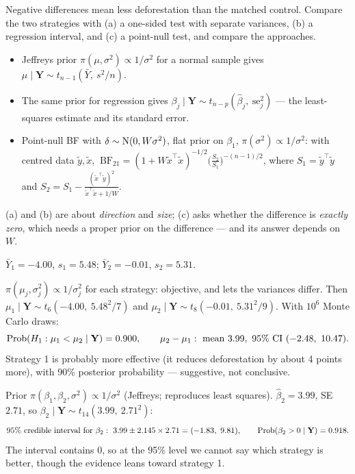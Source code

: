 \documentclass[11pt]{article}
\begin{document}
\begin{restate}
Negative differences mean less deforestation than the matched control. Compare the two strategies with (a) a one-sided test with separate variances, (b) a regression interval, and (c) a point-null test, and compare the approaches.
\end{restate}

\begin{recall}
\begin{itemize}
\item Jeffreys prior $\pi(\mu,\sigma^2)\propto1/\sigma^2$ for a normal sample gives $\mu\mid\mathbf Y\sim t_{n-1}(\bar Y,\ s^2/n)$.
\item The same prior for regression gives $\beta_j\mid\mathbf Y\sim t_{n-p}(\hat\beta_j,\ \text{se}_j^2)$ --- the least-squares estimate and its standard error.
\item Point-null BF with $\delta\sim\mathrm{N}(0,W\sigma^2)$, flat prior on $\beta_1$, $\pi(\sigma^2)\propto1/\sigma^2$: with centred data $\tilde y,\tilde x$,
$\ \text{BF}_{21}=(1+W\tilde x^\top\tilde x)^{-1/2}\Big(\frac{S_2}{S_1}\Big)^{-(n-1)/2}$, where $S_1=\tilde y^\top\tilde y$ and $S_2=S_1-\frac{(\tilde x^\top\tilde y)^2}{\tilde x^\top\tilde x+1/W}$.
\end{itemize}
\end{recall}

\begin{keyidea}
(a) and (b) are about \emph{direction} and \emph{size}; (c) asks whether the difference is \emph{exactly zero}, which needs a proper prior on the difference --- and its answer depends on $W$.
\end{keyidea}

\solution
{} $\bar Y_1=-4.00$, $s_1=5.48$; $\bar Y_2=-0.01$, $s_2=5.31$.

 $\pi(\mu_j,\sigma_j^2)\propto1/\sigma_j^2$ for each strategy: objective, and lets the variances differ. Then $\mu_1\mid\mathbf Y\sim t_6(-4.00,\ 5.48^2/7)$ and $\mu_2\mid\mathbf Y\sim t_8(-0.01,\ 5.31^2/9)$. With $10^6$ Monte Carlo draws:
\[
\mathrm{Prob}(H_1:\mu_1<\mu_2\mid\mathbf Y)=0.900,\qquad\mu_2-\mu_1:\ \text{mean }3.99,\ 95\%\text{ CI }(-2.48,\ 10.47).
\]
Strategy 1 is probably more effective (it reduces deforestation by about 4 points more), with 90\% posterior probability --- suggestive, not conclusive.

 Prior $\pi(\beta_1,\beta_2,\sigma^2)\propto1/\sigma^2$ (Jeffreys; reproduces least squares). $\hat\beta_2=3.99$, SE $2.71$, so $\beta_2\mid\mathbf Y\sim t_{14}(3.99,\ 2.71^2)$:
\[
95\%\text{ credible interval for }\beta_2:\ 3.99\pm2.145\times2.71=(-1.83,\ 9.81),\qquad\mathrm{Prob}(\beta_2>0\mid\mathbf Y)=0.918.
\]
The interval contains 0, so at the 95\% level we cannot say which strategy is better, though the evidence leans toward strategy 1.
\end{document}
